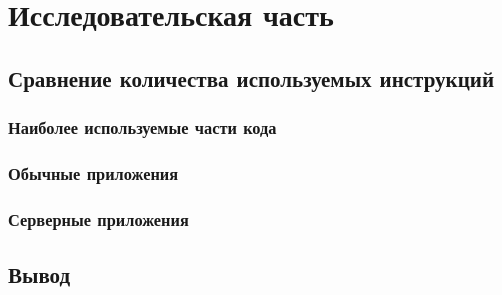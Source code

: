 \section{Исследовательская часть}

\subsection{Сравнение количества используемых инструкций}

\subsubsection{Наиболее используемые части кода}

\subsubsection{Обычные приложения}

\subsubsection{Серверные приложения}

\subsection{Вывод}

\pagebreak
